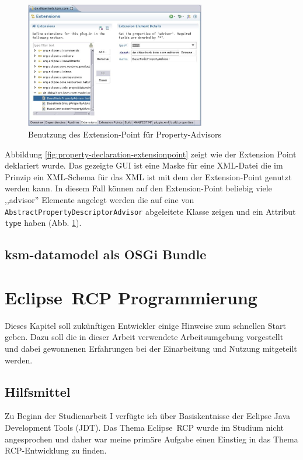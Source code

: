 \documentclass[%
12pt,titlepage,abstracton]{scrreprt}
\begin{document}
\begin{figure}[mt]
\centering
\includegraphics[width=0.7\textwidth]{images/eclipse-property-usage-extensionpoint.jpg}
\caption{Benutzung des Extension-Point für Property-Advisors}
\label{fig:eclipse-property-usage-extensionpoint}
\end{figure}

Abbildung \ref{fig:property-declaration-extensionpoint} zeigt wie der Extension
Point deklariert wurde. Das gezeigte GUI ist eine Maske für eine XML-Datei die
im Prinzip ein XML-Schema für das XML ist mit dem der Extension-Point
genutzt werden kann. In diesem Fall können auf den Extension-Point beliebig
viele ,,advisor'' Elemente angelegt werden die auf eine von
\texttt{Abstract\-Property\-Descriptor\-Advisor} abgeleitete Klasse zeigen und
ein Attribut \texttt{type} haben (Abb.
\ref{fig:eclipse-property-usage-extensionpoint}).


\section{ksm-datamodel als OSGi Bundle}

\chapter{Eclipse~RCP Programmierung}\label{chapter:rcpprogrammierung}
Dieses Kapitel soll zukünftigen Entwickler einige Hinweise zum schnellen Start
geben. Dazu soll die in dieser Arbeit verwendete Arbeitsumgebung vorgestellt und
dabei gewonnenen Erfahrungen bei der Einarbeitung und Nutzung mitgeteilt werden.

\section{Hilfsmittel}
Zu Beginn der Studienarbeit I verfügte ich über Basiskentnisse der Eclipse
Java Development Tools (JDT). Das Thema Eclipse~RCP wurde im Studium nicht
angesprochen und daher war meine primäre Aufgabe einen Einstieg in das Thema
RCP-Entwicklung zu finden.
\end{document}

